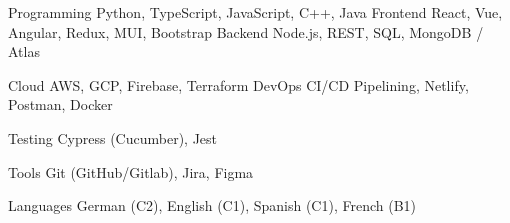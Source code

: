 

\begin{cvskills}

  \cvskill
    {Programming} %
    {Python, TypeScript, JavaScript, C++, Java} %
  \cvskill
    {Frontend} %
    {React, Vue, Angular, Redux, MUI, Bootstrap} %
  \cvskill
    {Backend} %
    {Node.js, REST, SQL, MongoDB / Atlas} %

  \cvskill
    {Cloud} %
    {AWS, GCP, Firebase, Terraform} %
  \cvskill
    {DevOps} %
    {CI/CD Pipelining, Netlify, Postman, Docker} %
    
  \cvskill
    {Testing} %
    {Cypress (Cucumber), Jest} %

  \cvskill
    {Tools} %
    {Git (GitHub/Gitlab), Jira, Figma} %

  \cvskill
    {Languages} %
    {German (C2), English (C1), Spanish (C1), French (B1)} %

\end{cvskills}
